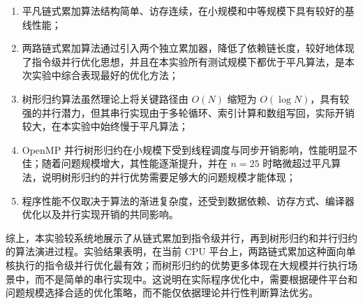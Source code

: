 \documentclass[a4paper,12pt]{ctexart}
\begin{document}
\begin{enumerate}
  \item 平凡链式累加算法结构简单、访存连续，在小规模和中等规模下具有较好的基线性能；
  \item 两路链式累加算法通过引入两个独立累加器，降低了依赖链长度，较好地体现了指令级并行优化思想，并且在本实验所有测试规模下都优于平凡算法，是本次实验中综合表现最好的优化方法；
  \item 树形归约算法虽然理论上将关键路径由 $O(N)$ 缩短为 $O(\log N)$，具有较强的并行潜力，但其串行实现由于多轮循环、索引计算和数组写回，实际开销较大，在本实验中始终慢于平凡算法；
  \item OpenMP 并行树形归约在小规模下受到线程调度与同步开销影响，性能明显不佳；随着问题规模增大，其性能逐渐提升，并在 $n=25$ 时略微超过平凡算法，说明树形归约的并行优势需要足够大的问题规模才能体现；
  \item 程序性能不仅取决于算法的渐进复杂度，还受到数据依赖、访存方式、编译器优化以及并行实现开销的共同影响。
\end{enumerate}
综上，本实验较系统地展示了从链式累加到指令级并行，再到树形归约和并行归约的算法演进过程。实验结果表明，在当前 CPU 平台上，两路链式累加这种面向单核执行的指令级并行优化最有效；而树形归约的优势更多体现在大规模并行执行场景中，而不是简单的串行实现中。这说明在实际程序优化中，需要根据硬件平台和问题规模选择合适的优化策略，而不能仅依据理论并行性判断算法优劣。
\end{document}
